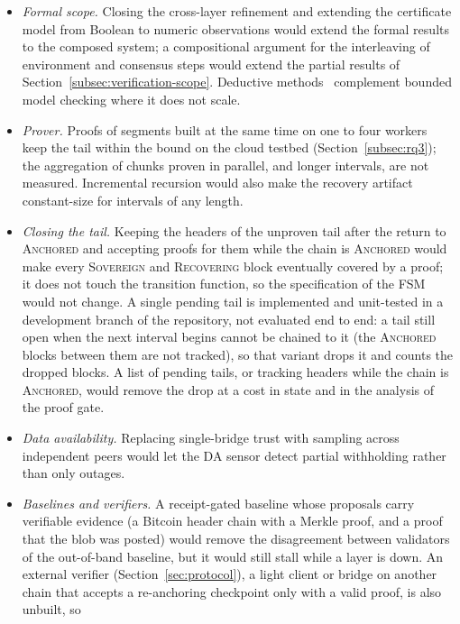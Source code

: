 \begin{itemize}
  \item \emph{Formal scope.} Closing the cross-layer refinement and extending
  the certificate model from Boolean to numeric observations would extend the
  formal results to the composed system; a compositional argument for the
  interleaving of environment and consensus steps would extend the partial results
  of Section~\ref{subsec:verification-scope}. Deductive
  methods~\cite{padon2016ivy,lotan2025implicit} complement bounded model checking
  where it does not scale.
  \item \emph{Prover.} Proofs of segments built at the same time on one to four workers keep the tail within the bound
  on the cloud testbed (Section~\ref{subsec:rq3}); the aggregation of chunks proven in parallel, and
  longer intervals, are not measured. Incremental recursion would also make the recovery artifact constant-size for
  intervals of any length.
  \item \emph{Closing the tail.} Keeping the headers of the unproven tail after the return to \textsc{Anchored} and
  accepting proofs for them while the chain is \textsc{Anchored} would make every \textsc{Sovereign} and \textsc{Recovering} block
  eventually covered by a proof; it does not touch the transition function, so the specification of the FSM would not change.
  A single pending tail is implemented and unit-tested in a development branch of the repository, not evaluated end to end: a
  tail still open when the next interval begins cannot be chained to it (the \textsc{Anchored} blocks between them are not
  tracked), so that variant drops it and counts the dropped blocks. A list of pending tails, or tracking headers while the chain
  is \textsc{Anchored}, would remove the drop at a cost in state and in the analysis of the proof gate.
  \item \emph{Data availability.} Replacing single-bridge trust with sampling
  across independent peers would let the DA sensor detect partial withholding
  rather than only outages.
  \item \emph{Baselines and verifiers.} A receipt-gated baseline whose proposals
  carry verifiable evidence (a Bitcoin header chain with a Merkle proof, and a proof
  that the blob was posted) would remove the disagreement between validators of the
  out-of-band baseline, but it would still stall while a layer is down. An external
  verifier (Section~\ref{sec:protocol}), a light client or bridge on another chain
  that accepts a re-anchoring checkpoint only with a valid proof, is also unbuilt, so

\end{itemize}
